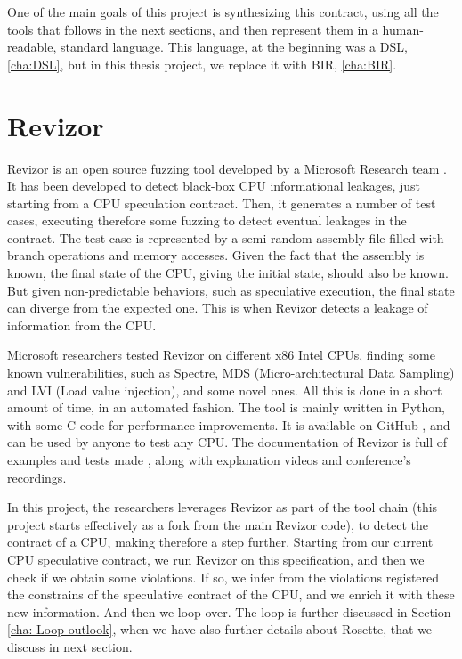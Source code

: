 One of the main goals of this project is synthesizing this contract, using all the
tools that follows in the next sections, and then represent them in a human-readable,
standard language. This language, at the beginning was a DSL, \cref{cha:DSL}, but
in this thesis project, we replace it with BIR, \cref{cha:BIR}.

\section{Revizor}
\label{cha:Revizor} Revizor is an open source fuzzing tool developed by a Microsoft
Research team \cite{article}. It has been developed to detect black-box CPU
informational leakages, just starting from a CPU speculation contract. Then, it generates
a number of test cases, executing therefore some fuzzing to detect eventual
leakages in the contract. The test case is represented by a semi-random assembly
file filled with branch operations and memory accesses. Given the fact that the
assembly is known, the final state of the CPU, giving the initial state, should also
be known. But given non-predictable behaviors, such as speculative execution,
the final state can diverge from the expected one. This is when Revizor detects a
leakage of information from the CPU.

Microsoft researchers tested Revizor on different x86 Intel CPUs, finding some
known vulnerabilities, such as Spectre, MDS (Micro-architectural Data Sampling)
and LVI (Load value injection), and some novel ones. All this is done in a short
amount of time, in an automated fashion. The tool is mainly written in Python, with
some C code for performance improvements. It is available on GitHub \cite{repo},
and can be used by anyone to test any CPU. The documentation of Revizor is full
of examples and tests made \cite{misc}, along with explanation videos and conference's
recordings.

In this project, the researchers leverages Revizor as part of the tool chain (this
project starts effectively as a fork from the main Revizor code), to detect the contract
of a CPU, making therefore a step further. Starting from our current CPU speculative
contract, we run Revizor on this specification, and then we check if we obtain some
violations. If so, we infer from the violations registered the constrains of the
speculative contract of the CPU, and we enrich it with these new information. And
then we loop over. The loop is further discussed in Section
\cref{cha: Loop outlook}, when we have also further details about Rosette, that
we discuss in next section.

